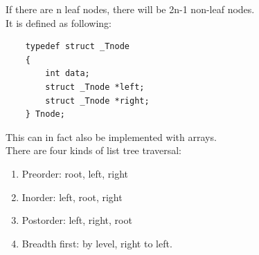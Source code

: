\documentclass[nobib]{tufte-handout}
\begin{document}
If there are n leaf nodes, there will be 2n-1 non-leaf nodes.\\
It is defined as following:\\
\begin{lstlisting}
    typedef struct _Tnode
    {
        int data;
        struct _Tnode *left;
        struct _Tnode *right;
    } Tnode;
\end{lstlisting}
This can in fact also be implemented with arrays.\\
There are four kinds of list tree traversal:
\begin{enumerate}
    \item Preorder: root, left, right
    \item Inorder: left, root, right
    \item Postorder: left, right, root
    \item Breadth first: by level, right to left.
\end{enumerate}
\end{document}
